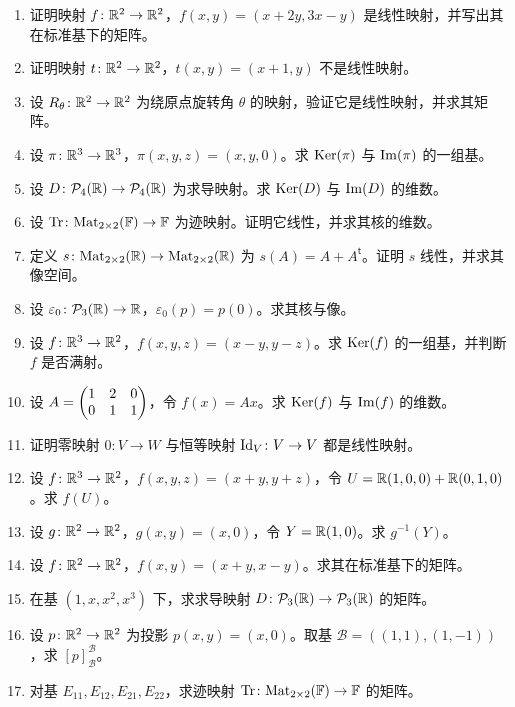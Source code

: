 \begin{enumerate}[label=\textbf{\arabic*.}, leftmargin=3.5em]
  \item {\basic} 证明映射 $f\colon \mathbb{R}^2\to\mathbb{R}^2$，$f(x,y)=(x+2y,3x-y)$ 是线性映射，并写出其在标准基下的矩阵。
  \item {\basic} 证明映射 $t\colon \mathbb{R}^2\to\mathbb{R}^2$，$t(x,y)=(x+1,y)$ 不是线性映射。
  \item {\basic} 设 $R_{\theta}\colon \mathbb{R}^2\to\mathbb{R}^2$ 为绕原点旋转角 $\theta$ 的映射，验证它是线性映射，并求其矩阵。
  \item {\basic} 设 $\pi\colon \mathbb{R}^3\to\mathbb{R}^3$，$\pi(x,y,z)=(x,y,0)$。求 $\mathrm{Ker}(\pi)$ 与 $\mathrm{Im}(\pi)$ 的一组基。
  \item {\basic} 设 $D\colon \mathcal P_4(\mathbb{R})\to\mathcal P_4(\mathbb{R})$ 为求导映射。求 $\mathrm{Ker}(D)$ 与 $\mathrm{Im}(D)$ 的维数。
  \item {\basic} 设 $\mathrm{Tr}\colon \mathrm{Mat}_{2\times 2}(\mathbb{F})\to\mathbb{F}$ 为迹映射。证明它线性，并求其核的维数。
  \item {\basic} 定义 $s\colon \mathrm{Mat}_{2\times 2}(\mathbb{R})\to\mathrm{Mat}_{2\times 2}(\mathbb{R})$ 为 $s(A)=A+A^\mathsf{t}$。证明 $s$ 线性，并求其像空间。
  \item {\basic} 设 $\varepsilon_0\colon \mathcal P_3(\mathbb{R})\to\mathbb{R}$，$\varepsilon_0(p)=p(0)$。求其核与像。
  \item {\basic} 设 $f\colon \mathbb{R}^3\to\mathbb{R}^2$，$f(x,y,z)=(x-y,y-z)$。求 $\mathrm{Ker}(f)$ 的一组基，并判断 $f$ 是否满射。
  \item {\basic} 设 $A=\begin{pmatrix} 1 & 2 & 0\\ 0 & 1 & 1 \end{pmatrix}$，令 $f(x)=Ax$。求 $\mathrm{Ker}(f)$ 与 $\mathrm{Im}(f)$ 的维数。
  \item {\basic} 证明零映射 $0\colon V\to W$ 与恒等映射 $\mathrm{Id}_V\colon V\to V$ 都是线性映射。
  \item {\basic} 设 $f\colon \mathbb{R}^3\to\mathbb{R}^2$，$f(x,y,z)=(x+y,y+z)$，令 $U=\mathbb{R}(1,0,0)+\mathbb{R}(0,1,0)$。求 $f(U)$。
  \item {\basic} 设 $g\colon \mathbb{R}^2\to\mathbb{R}^2$，$g(x,y)=(x,0)$，令 $Y=\mathbb{R}(1,0)$。求 $g^{-1}(Y)$。
  \item {\basic} 设 $f\colon \mathbb{R}^2\to\mathbb{R}^2$，$f(x,y)=(x+y,x-y)$。求其在标准基下的矩阵。
  \item {\basic} 在基 $(1,x,x^2,x^3)$ 下，求求导映射 $D\colon \mathcal P_3(\mathbb{R})\to\mathcal P_3(\mathbb{R})$ 的矩阵。
  \item {\basic} 设 $p\colon \mathbb{R}^2\to\mathbb{R}^2$ 为投影 $p(x,y)=(x,0)$。取基 $\mathcal B=((1,1),(1,-1))$，求 $[p]_{\mathcal B}^{\mathcal B}$。
  \item {\basic} 对基 $E_{11},E_{12},E_{21},E_{22}$，求迹映射 $\mathrm{Tr}\colon \mathrm{Mat}_{2\times 2}(\mathbb{F})\to\mathbb{F}$ 的矩阵。

\end{enumerate}
